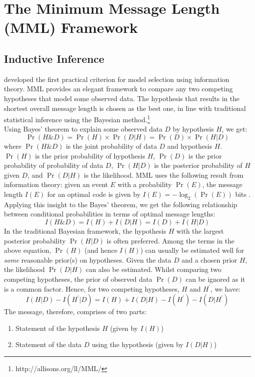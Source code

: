 \documentclass[wcp]{jmlr}
\begin{document}
\section{The Minimum Message Length (MML) Framework}
\subsection{Inductive Inference}
\citet{wallace68} developed the first practical criterion for model selection using 
information theory. MML provides an elegant framework to compare any two competing 
hypotheses that model some observed data. The hypothesis that results in the shortest 
overall message length is chosen as the best one, in line with traditional statistical 
inference using the Bayesian method.\footnote{http://allisons.org/ll/MML/} \\

Using Bayes' theorem to explain some observed data $D$ by hypothesis $H$, we get:
\begin{equation*}
  \Pr(H\&D) = \Pr(H) \times \Pr(D|H) = \Pr(D) \times \Pr(H|D)
\end{equation*}
where $\Pr(H\&D)$ is the joint probability of data $D$ and hypothesis $H$. $\Pr(H)$
is the prior probability of hypothesis $H$, $\Pr(D)$ is the prior probability of 
probability of data $D$, $\Pr(H|D)$ is the posterior probability of $H$
given $D$, and $\Pr(D|H)$ is the likelihood.
MML uses the following result from information theory: given an event $E$
with a probability $\Pr(E)$, the message length $I(E)$ for an optimal
code is given by $I(E) = -\log_2 (\Pr(E))$ bits \citep{shannon1948}. Applying this insight
to the Bayes' theorem, we get the following relationship between
conditional probabilities in terms of optimal message lengths:
\begin{equation*}
  I(H\&D) = I(H) + I(D|H) = I(D) + I(H|D)
\end{equation*}
In the traditional Bayesian framework, the hypothesis $H$ with
the largest posterior probability $\Pr(H|D)$ is often preferred.
Among the terms in the above equation, $\Pr(H)$ (and hence $I(H)$) can
usually be estimated well for \emph{some} reasonable prior(s) on hypotheses.
Given the data $D$ and a chosen prior $H$, the likelihood $\Pr(D|H)$ can also be estimated.
Whilst comparing two competing hypotheses, the prior of observed data $\Pr(D)$
can be ignored as it is a common factor. Hence, for two competing hypotheses, $H$ and $H^\prime$, we have:
\begin{equation*}
I(H|D) - I(H^\prime|D) = I(H) + I(D|H) - I(H^\prime) - I(D|H^\prime)
\end{equation*}
The message, therefore, comprises of two parts: 
\begin{enumerate}
\item Statement of the hypothesis $H$ (given by $I(H)$)  
\item Statement of the data $D$ using the hypothesis (given by $I(D|H)$) 
\end{enumerate}
\end{document}

